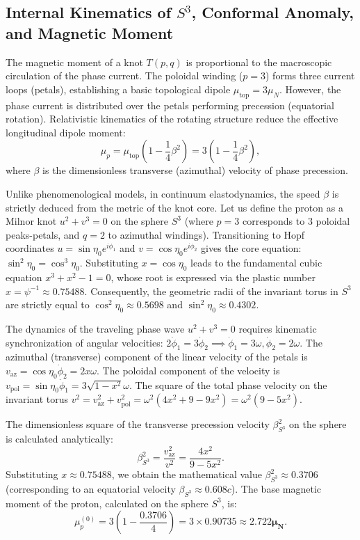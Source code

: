 \documentclass[11pt,a4paper]{article}
\begin{document}
\subsection{Internal Kinematics of $S^3$, Conformal Anomaly, and Magnetic Moment}
	The magnetic moment of a knot $T(p,q)$ is proportional to the macroscopic circulation of the phase current. The poloidal winding ($p=3$) forms three current loops (petals), establishing a basic topological dipole $\mu_{\text{top}} = 3 \mu_N$. However, the phase current is distributed over the petals performing precession (equatorial rotation). Relativistic kinematics of the rotating structure reduce the effective longitudinal dipole moment:
	\begin{equation}
		\mu_p = \mu_{\text{top}} \left(1 - \frac{1}{4}\beta^2\right) = 3 \left(1 - \frac{1}{4}\beta^2\right),
	\end{equation}
	where $\beta$ is the dimensionless transverse (azimuthal) velocity of phase precession.
	
	Unlike phenomenological models, in continuum elastodynamics, the speed $\beta$ is strictly deduced from the metric of the knot core. Let us define the proton as a Milnor knot $u^2 + v^3 = 0$ on the sphere $S^3$ (where $p=3$ corresponds to 3 poloidal peaks-petals, and $q=2$ to azimuthal windings). 
	Transitioning to Hopf coordinates $u = \sin\eta_0 e^{i\phi_1}$ and $v = \cos\eta_0 e^{i\phi_2}$ gives the core equation: $\sin^2\eta_0 = \cos^3\eta_0$. Substituting $x = \cos\eta_0$ leads to the fundamental cubic equation $x^3 + x^2 - 1 = 0$, whose root is expressed via the plastic number $x = \psi^{-1} \approx 0.75488$. Consequently, the geometric radii of the invariant torus in $S^3$ are strictly equal to $\cos^2\eta_0 \approx 0.5698$ and $\sin^2\eta_0 \approx 0.4302$.
	
	The dynamics of the traveling phase wave $u^2 + v^3 = 0$ requires kinematic synchronization of angular velocities: $2\dot{\phi}_1 = 3\dot{\phi}_2 \implies \dot{\phi}_1 = 3\omega, \dot{\phi}_2 = 2\omega$.
	The azimuthal (transverse) component of the linear velocity of the petals is $v_{\text{az}} = \cos\eta_0 \dot{\phi}_2 = 2x\omega$.
	The poloidal component of the velocity is $v_{\text{pol}} = \sin\eta_0 \dot{\phi}_1 = 3\sqrt{1-x^2}\omega$.
	The square of the total phase velocity on the invariant torus $v^2 = v_{\text{az}}^2 + v_{\text{pol}}^2 = \omega^2 (4x^2 + 9 - 9x^2) = \omega^2 (9 - 5x^2)$.
	
	The dimensionless square of the transverse precession velocity $\beta_{S^3}^2$ on the sphere is calculated analytically:
	\begin{equation}
		\beta_{S^3}^2 = \frac{v_{\text{az}}^2}{v^2} = \frac{4x^2}{9 - 5x^2}.
	\end{equation}
	Substituting $x \approx 0.75488$, we obtain the mathematical value $\beta_{S^3}^2 \approx 0.3706$ (corresponding to an equatorial velocity $\beta_{S^3} \approx 0.608 c$).
	The base magnetic moment of the proton, calculated on the sphere $S^3$, is:
	\begin{equation}
		\mu_p^{(0)} = 3 \left(1 - \frac{0.3706}{4}\right) = 3 \times 0.90735 \approx \mathbf{2.722 \mu_N}.
	\end{equation}
	
\end{document}
